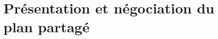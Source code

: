 \documentclass[a4paper,11pt,twoside]{StyleThese}
\begin{document}



\section{Présentation et négociation du plan partagé}
\label{planPresentation}
\end{document}
